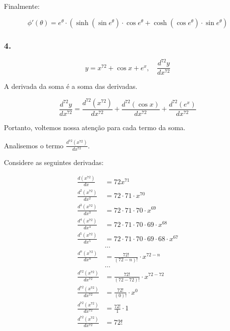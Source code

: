 \documentclass{article}
\begin{document}
Finalmente:

\[
    \phi'(\theta)
    =
    e^{\theta}
    \cdot
    (
    \sinh (\sin e^{\theta}) \cdot
    \cos e^{\theta}
    +
    \cosh (\cos e^{\theta}) \cdot
    \sin e^{\theta}
    )
\]

\subsubsection*{4.}

\[
    y = x^{72} + \cos x + e^x, \quad \frac{d^{72}y}{dx^{72}}
\]

A derivada da soma é a soma das derivadas.

\begin{equation}\label{eq:q4_soma}
    \frac{d^{72}y}{dx^{72}}
    =
    \frac{d^{72}(x^{72})}{dx^{72}}
    +
    \frac{d^{72}(\cos x )}{dx^{72}}
    +
    \frac{d^{72}(e^x)}{dx^{72}}
\end{equation}

Portanto, voltemos nossa atenção para cada termo da soma.

Analisemos o termo \(\frac{d^{72}(x^{72})}{dx^{72}} \).

Considere as seguintes derivadas:

\begin{align*}
    \frac{d(x^{72})}{dx}           & = 72x^{71}
    \\
    \frac{d^2(x^{72})}{dx^2}       & = 72 \cdot 71 \cdot x^{70}
    \\
    \frac{d^3(x^{72})}{dx^3}       & = 72 \cdot 71 \cdot 70 \cdot x^{69}
    \\
    \frac{d^4(x^{72})}{dx^4}       & = 72 \cdot 71 \cdot 70 \cdot 69 \cdot x^{68}
    \\
    \frac{d^5(x^{72})}{dx^5}       & = 72 \cdot 71 \cdot 70 \cdot 69 \cdot 68 \cdot x^{67}
    \\
                                   & \dots
    \\
    \frac{d^n(x^{72})}{dx^n}       & = \frac{72!}{(72 - n)!} \cdot x^{72 - n}
    \\
                                   & \dots
    \\
    \frac{d^{72}(x^{72})}{dx^{72}} & = \frac{72!}{(72 - 72)!} \cdot x^{72 - 72}
    \\
    \frac{d^{72}(x^{72})}{dx^{72}} & = \frac{72!}{(0)!} \cdot x^{0}
    \\
    \frac{d^{72}(x^{72})}{dx^{72}} & = \frac{72!}{1} \cdot 1
    \\
    \frac{d^{72}(x^{72})}{dx^{72}} & = 72!
\end{align*}
\end{document}
